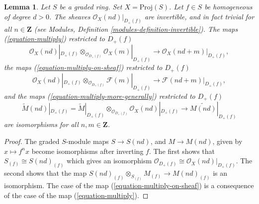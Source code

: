 \documentclass{stacks-project}
\theoremstyle{plain}
\newtheorem{lemma}[subsection]{Lemma}
\theoremstyle{definition}
\theoremstyle{remark}
\numberwithin{equation}{subsection}
\begin{document}
\begin{lemma}
\label{lemma-when-invertible}
Let $S$ be a graded ring. Set $X = \text{Proj}(S)$.
Let $f \in S$ be homogeneous of degree $d > 0$.
The sheaves $\mathcal{O}_X(nd)|_{D_{+}(f)}$ are invertible,
and in fact trivial for all $n \in \mathbf{Z}$
(see Modules, Definition \ref{modules-definition-invertible}).
The maps (\ref{equation-multiply}) restricted to $D_{+}(f)$
$$
\mathcal{O}_X(nd)|_{D_{+}(f)} \otimes_{\mathcal{O}_{D_{+}(f)}}
\mathcal{O}_X(m)|_{D_{+}(f)}
\longrightarrow
\mathcal{O}_X(nd + m)|_{D_{+}(f)},
$$
the maps (\ref{equation-multiply-on-sheaf}) restricted to $D_+(f)$
$$
\mathcal{O}_X(nd)|_{D_{+}(f)} \otimes_{\mathcal{O}_{D_{+}(f)}}
\mathcal{F}(m)|_{D_{+}(f)}
\longrightarrow
\mathcal{F}(nd + m)|_{D_{+}(f)},
$$
and the maps (\ref{equation-multiply-more-generally})
restricted to $D_{+}(f)$
$$
\widetilde M(nd)|_{D_{+}(f)}
=
\widetilde M|_{D_{+}(f)}
\otimes_{\mathcal{O}_{D_{+}(f)}}
\mathcal{O}_X(nd)|_{D_{+}(f)}
\longrightarrow
\widetilde{M(nd)}|_{D_{+}(f)}
$$
are isomorphisms for all $n, m \in \mathbf{Z}$.
\end{lemma}

\begin{proof}
The graded $S$-module maps $S \to S(nd)$, and $M \to M(nd)$, given by
$x \mapsto f^n x$ become isomorphisms after inverting $f$. The first shows that
$S_{(f)} \cong S(nd)_{(f)}$ which gives an isomorphism
$\mathcal{O}_{D_{+}(f)} \cong \mathcal{O}_X(nd)|_{D_{+}(f)}$.
The second shows that the map
$S(nd)_{(f)} \otimes_{S_{(f)}} M_{(f)} \to M(nd)_{(f)}$
is an isomorphism. The case of the map (\ref{equation-multiply-on-sheaf})
is a consequence of the case of the map (\ref{equation-multiply}).
\end{proof}
\end{document}
